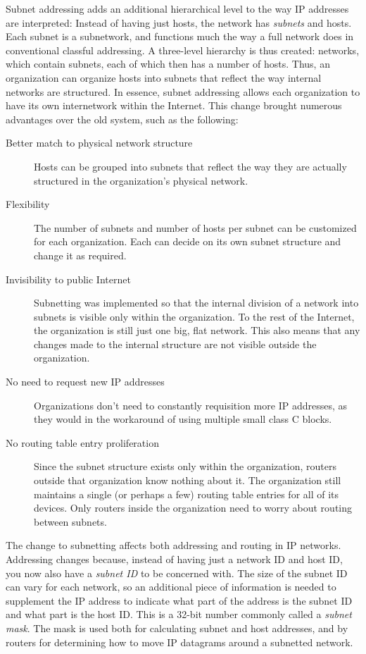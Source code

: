 Subnet addressing adds an additional hierarchical level to the way IP
addresses are interpreted: Instead of having just hosts, the network has
{\emph{subnets}} and hosts. Each subnet is a subnetwork, and functions
much the way a full network does in conventional classful addressing. A
three-level hierarchy is thus created: networks, which contain subnets,
each of which then has a number of hosts. Thus, an organization can
organize hosts into subnets that reflect the way internal networks are
structured. In essence, subnet addressing allows each organization to
have its own internetwork within the Internet. This change brought
numerous advantages over the old system, such as the following:
\begin{description}
   \item[Better match to physical network structure]
      Hosts can be grouped into subnets that reflect the way they are actually structured in the organization's physical network.

   \item[Flexibility]
      The number of subnets and number of hosts per subnet can be customized for each organization.
      Each can decide on its own subnet structure and change it as required.

   \item[Invisibility to public Internet]
      Subnetting was implemented so that the internal division of a network into subnets is visible only within the organization.
      To the rest of the Internet, the organization is still just one big, flat network.
      This also means that any changes made to the internal structure are not visible outside the organization.

   \item[No need to request new IP addresses]
      Organizations don't need to constantly requisition more IP addresses, as they would in the workaround of using multiple small class C blocks.

   \item[No routing table entry proliferation]
      Since the subnet structure exists only within the organization, routers outside that organization know nothing about it.
      The organization still maintains a single (or perhaps a few) routing table entries for all of its devices.
      Only routers inside the organization need to worry about routing between subnets.
\end{description}


The change to subnetting affects both addressing and routing in IP
networks. Addressing changes because, instead of having just a network
ID and host ID, you now also have a {\emph{subnet ID}} to be concerned
with. The size of the subnet ID can vary for each network, so an
additional piece of information is needed to supplement the IP address
to indicate what part of the address is the subnet ID and what part is
the host ID. This is a 32-bit number commonly called a \emph{subnet mask}.
The mask is used both for calculating subnet and host addresses, and by routers for determining how to move IP datagrams around a
subnetted network.

